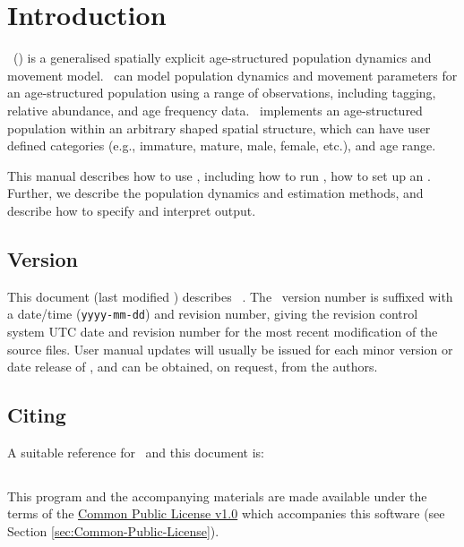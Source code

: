 \section{Introduction\label{sec:Introduction}}

\SPM\ (\SPMName) is a generalised spatially explicit age-structured population dynamics and movement model. \SPM\ can model population dynamics and movement parameters for an age-structured population using a range of observations, including tagging, relative abundance, and age frequency data. \SPM\ implements an age-structured population within an arbitrary shaped spatial structure, which can have user defined categories (e.g., immature, mature, male, female, etc.), and age range. 

This manual describes how to use \SPM, including how to run \SPM, how to set up an \config. Further, we describe the population dynamics and estimation methods, and describe how to specify and interpret output. 

\subsection{Version\label{sec:version}}

This document (last modified \DocVer) describes \SPM\ \VER. The \SPM\ version number is suffixed with a date/time (\texttt{yyyy-mm-dd}) and revision number, giving the revision control system UTC date and revision number for the most recent modification of the source files. User manual updates will usually be issued for each minor version or date release of \SPM, and can be obtained, on request, from the authors.

\subsection{Citing \SPM}

A suitable reference for \SPM\ and this document is:

\ManualRef{}

\subsection{}

This program and the accompanying materials are made available under the terms of the \href{http://www.opensource.org/licenses/cpl1.0.php}{Common Public License v1.0} which accompanies this software (see Section \ref{sec:Common-Public-License}).

